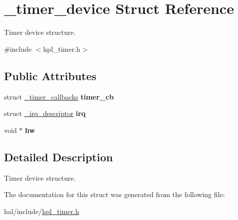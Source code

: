 \hypertarget{struct__timer__device}{}\section{\+\_\+timer\+\_\+device Struct Reference}
\label{struct__timer__device}


Timer device structure.  




{\ttfamily \#include $<$hpl\+\_\+timer.\+h$>$}

\subsection*{Public Attributes}
\begin{DoxyCompactItemize}
\item 
\mbox{\label{struct__timer__device_a921ec126c67c0fb917d7424dce4cc183}} 
struct \hyperlink{struct__timer__callbacks}{\+\_\+timer\+\_\+callbacks} {\bfseries timer\+\_\+cb}
\item 
\mbox{\label{struct__timer__device_a34ce0abd06b977454a91a77becb94b2c}} 
struct \hyperlink{struct__irq__descriptor}{\+\_\+irq\+\_\+descriptor} {\bfseries irq}
\item 
\mbox{\label{struct__timer__device_a8fdec7e7b34dbe5ae56179405296ad27}} 
void $\ast$ {\bfseries hw}
\end{DoxyCompactItemize}


\subsection{Detailed Description}
Timer device structure. 

The documentation for this struct was generated from the following file\+:\begin{DoxyCompactItemize}
\item 
hal/include/\hyperlink{hpl__timer_8h}{hpl\+\_\+timer.\+h}\end{DoxyCompactItemize}

